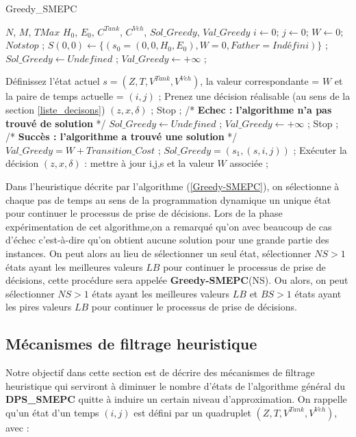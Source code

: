 \begin{algorithm} 
	\caption{Greedy\_SMEPC}
	\label{Greedy-SMEPC}
	\begin{algorithmic}[1]
		\REQUIRE $N$, $M$, $TMax$ $H_0$, $E_0$, $C^{Tank}$, $C^{Veh}$,
		\ENSURE $Sol\_Greedy$, $Val\_Greedy$
		\hline
		\vspace{0.5cm}
		\INITIALISATION
		\STATE $i \leftarrow 0$; $j \leftarrow 0$; $W \leftarrow 0$; $Not stop$ ;
		\STATE $S(0,0) \leftarrow \{(s_0=(0,0,H_0,E_0), W=0, Father=Indéfini)\}$ ;
		\STATE $Sol\_Greedy \leftarrow Undefined$ ; $Val\_Greedy \leftarrow +\infty$ ;
		\vspace{0.3cm}
		
		\BOUCLEPRINCIPAL
		\vspace{0.2cm}
		\STATE Définissez l'état actuel $s = (Z, T, V^{Tank} , V^{Veh})$, la valeur correspondante = $W$ et la paire de temps actuelle = $(i, j)$ ;
		\STATE Prenez une décision réalisable (au sens de la section \ref{liste_decisons}) $(z, x, \delta)$ ;
		\STATE Stop ; /* \textbf{Echec : l'algorithme n'a pas trouvé de solution} */
		\STATE $Sol\_Greedy \leftarrow Undefined$ ; $Val\_Greedy \leftarrow +\infty$ ;
		\ELSE
		\STATE Stop ; /* \textbf{Succès : l'algorithme a trouvé une solution} */
		\STATE $Val\_Greedy = W+Transition\_Cost$ ;
		\STATE$Sol\_Greedy=(s_1, (s,i,j))$ ;
		\ELSE
		\STATE Exécuter la décision $(z,x,\delta)$ : mettre à jour i,j,s et la valeur $W$ associée ;
		\ENDIF
		\ENDIF
		\ENDWHILE
	\end{algorithmic}
\end{algorithm}

Dans l'heuristique décrite par l'algorithme (\ref{Greedy-SMEPC}), on sélectionne à chaque pas de temps au sens de la programmation dynamique un unique état pour continuer le processus de prise de décisions. Lors de la phase expérimentation de cet algorithme,on a remarqué qu'on avec beaucoup de cas d'échec c'est-à-dire qu'on obtient aucune solution pour une grande partie des instances. On peut alors au lieu de sélectionner un seul état, sélectionner $NS > 1$ états ayant les meilleures valeurs $LB$ pour continuer le processus de prise de décisions, cette procédure sera appelée \textbf{Greedy-SMEPC}(NS). Ou alors, on peut sélectionner $NS > 1$ états ayant les meilleures valeurs $LB$ et $BS > 1$ états ayant les pires valeurs $LB$ pour continuer le processus de prise de décisions.

\subsection{Mécanismes de filtrage heuristique}
Notre objectif dans cette section est de décrire des mécanismes de filtrage heuristique qui serviront à diminuer le nombre d'états de l'algorithme général du \textbf{DPS\_SMEPC} quitte à induire un certain niveau d'approximation.
On rappelle qu'un état d'un temps $(i,j)$ est défini par un quadruplet $ (Z, T, V^{Tank}, V^{Veh})$, avec :

